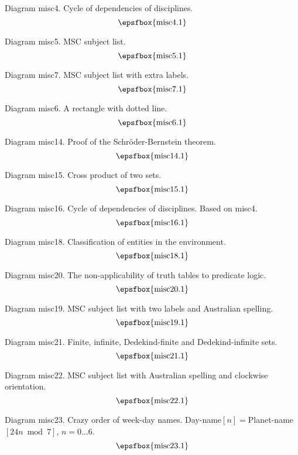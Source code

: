 Diagram misc4. Cycle of dependencies of disciplines.
$$
\centerline{\epsfbox{misc4.1}}
$$

\filleject

Diagram misc5. MSC subject list.
$$
\centerline{\epsfbox{misc5.1}}
$$

\filleject

Diagram misc7. MSC subject list with extra labels.
$$
\centerline{\epsfbox{misc7.1}}
$$

\filleject

Diagram misc6. A rectangle with dotted line.
$$
\centerline{\epsfbox{misc6.1}}
$$

Diagram misc14. Proof of the Schr\"oder-Bernstein theorem.
$$
\centerline{\epsfbox{misc14.1}}
$$

Diagram misc15. Cross product of two sets.
$$
\centerline{\epsfbox{misc15.1}}
$$

\filleject

Diagram misc16. Cycle of dependencies of disciplines. Based on misc4.
$$
\centerline{\epsfbox{misc16.1}}
$$

Diagram misc18. Classification of entities in the environment.
$$
\centerline{\epsfbox{misc18.1}}
$$

Diagram misc20. The non-applicability of truth tables to predicate logic.
$$
\centerline{\epsfbox{misc20.1}}
$$

\filleject

Diagram misc19. MSC subject list with two labels and Australian
spelling.
$$
\centerline{\epsfbox{misc19.1}}
$$

Diagram misc21. Finite, infinite, Dedekind-finite and Dedekind-infinite sets.
$$
\centerline{\epsfbox{misc21.1}}
$$

\filleject

Diagram misc22. MSC subject list with Australian spelling and clockwise
orientation.
$$
\centerline{\epsfbox{misc22.1}}
$$

Diagram misc23. Crazy order of week-day names.
Day-name$[n]={}$Planet-name$[24n\bmod 7]$, $n=0\dots6$.
$$
\centerline{\epsfbox{misc23.1}}
$$

